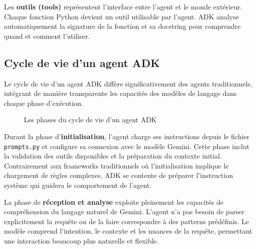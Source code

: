 Les \textbf{outils (tools)} représentent l'interface entre l'agent et le monde extérieur. Chaque fonction Python devient un outil utilisable par l'agent. ADK analyse automatiquement la signature de la fonction et sa docstring pour comprendre quand et comment l'utiliser.

\subsection{Cycle de vie d'un agent ADK}

Le cycle de vie d'un agent ADK diffère significativement des agents traditionnels, intégrant de manière transparente les capacités des modèles de langage dans chaque phase d'exécution.

 \begin{figure}[H]
\centering
{}
\caption{Les phases du cycle de vie d'un agent ADK}
\end{figure}

Durant la phase d'\textbf{initialisation}, l'agent charge ses instructions depuis le fichier \texttt{prompts.py} et configure sa connexion avec le modèle Gemini. Cette phase inclut la validation des outils disponibles et la préparation du contexte initial. Contrairement aux frameworks traditionnels où l'initialisation implique le chargement de règles complexes, ADK se contente de préparer l'instruction système qui guidera le comportement de l'agent.

La phase de \textbf{réception et analyse} exploite pleinement les capacités de compréhension du langage naturel de Gemini. L'agent n'a pas besoin de parser explicitement la requête ou de la faire correspondre à des patterns prédéfinis. Le modèle comprend l'intention, le contexte et les nuances de la requête, permettant une interaction beaucoup plus naturelle et flexible.

